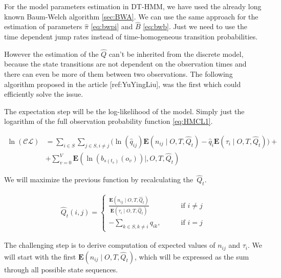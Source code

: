 \documentclass[thesis=M,english]{FITthesis}[2012/10/20]
\begin{document}

For the model parameters estimation in DT-HMM, we have used the already long known Baum-Welch algorithm \ref{sec:BWA}. We can use the same approach for the estimation of parameters $\hat \pi$ \eqref{eq:bwpi} and $\hat B$ \eqref{eq:bwb}. Just we need to use the time dependent jump rates instead of time-homogeneous transition probabilities. %

However the estimation of the $\hat Q$ can't be inherited from the discrete model, because the state transitions are not dependent on the observation times and there can even be more of them between two observations. The following algorithm proposed in the article [ref:YuYingLiu], was the first which could efficiently solve the issue.        

The expectation step will be the log-likelihood of the model. Simply just the logarithm of the full observation probability function \eqref{eq:HMCL1}.

\begin{equation}\label{eq:EMCTHMM}
\begin{aligned}  
 \ln(\mathcal{CL}) &= \sum_{i \in S} \sum_{j \in S, i \neq j} \big( \ln( \hat q_{ij}) \mathbf{E}( n_{ij} \mid O,T, \hat Q_t ) - \hat q_i \mathbf{E}( \tau_i \mid O,T, \hat Q_t ) \big) + \\
    &+ \sum_{v=0}^V \mathbf{E}( \ln( b_{s(t_v)}(o_v) ) \mid, O,T,\hat Q_t )
\end{aligned}
\end{equation}

We will maximize the previous function by recalculating the~$\hat Q_t$. 

\begin{equation}
\begin{aligned}  
\hat Q_t(i,j)= 
\begin{cases}
\frac{ \mathbf{E}(n_{ij} \mid O,T, \hat Q_t )}{ \mathbf{E}( \tau_i \mid O,T, \hat Q_t ) } & \text{if } i\neq j\\
- \sum\limits_{k \in S ,k \neq i} q_{ik}, \qquad & \text{if } i=j
\end{cases}
\end{aligned}
\end{equation}

The challenging step is to derive computation of expected values of $n_{ij}$ and $\tau_i$. We will start with the first $\mathbf{E}(n_{ij} \mid O,T, \hat Q_t )$, which will be expressed as the sum through all possible state sequences.
\end{document}
